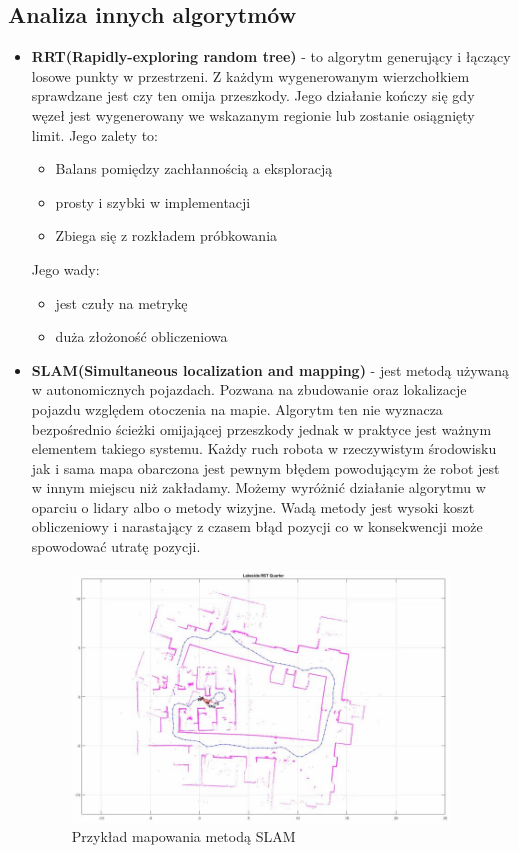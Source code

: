 \subsection{Analiza innych algorytmów}
\begin{itemize}
	\item{ \textbf{RRT(Rapidly-exploring random tree)}\cite{RRTLec} - to algorytm generujący i łączący 
	losowe punkty w przestrzeni. Z każdym wygenerowanym wierzchołkiem sprawdzane jest czy ten omija przeszkody.
	Jego działanie kończy się gdy węzeł jest wygenerowany we wskazanym regionie lub zostanie osiągnięty limit.
	Jego zalety to:
		\begin{itemize}
			\item Balans pomiędzy zachłannością a eksploracją
			\item prosty i szybki w implementacji
			\item Zbiega się z rozkładem próbkowania
		\end{itemize}
	Jego wady:
		\begin{itemize}
			\item jest czuły na metrykę
			\item duża złożoność obliczeniowa
		\end{itemize}
	}
	\item{\textbf{SLAM(Simultaneous localization and mapping)} \cite{SLAMMat} - jest metodą używaną w autonomicznych 
	pojazdach. Pozwana na zbudowanie oraz lokalizacje pojazdu względem otoczenia na mapie. Algorytm ten nie wyznacza bezpośrednio
	ścieżki omijającej przeszkody jednak w praktyce jest ważnym elementem takiego systemu. Każdy ruch robota w rzeczywistym 
	środowisku jak i sama mapa obarczona jest pewnym błędem powodującym że robot jest w innym miejscu niż zakładamy. 
	Możemy wyróżnić działanie algorytmu w oparciu o lidary albo o metody wizyjne. Wadą metody jest wysoki koszt obliczeniowy 
	i narastający z czasem błąd pozycji co w konsekwencji może spowodować utratę pozycji.
	\begin{figure}[H]
		\centering
		\includegraphics[width=10cm]{pages/algorytm/zdjecia/slam.jpg}
		\caption{Przykład mapowania metodą SLAM\cite{SLAMMat}}
	\end{figure}
	}
\end{itemize}
